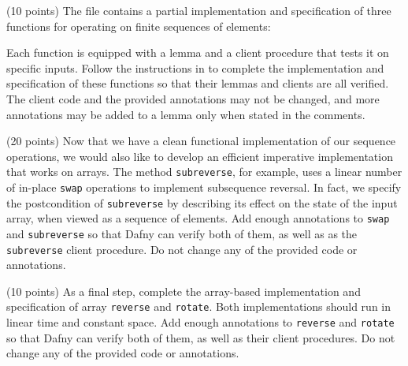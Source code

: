 \documentclass{handout}
\begin{document}
\begin{questions}

\item (10 points) \label{prob:dafny-first} The file  
contains a partial implementation and specification of three functions for
operating on finite sequences of elements:


Each function is equipped with a lemma and a client procedure that tests it on
specific inputs. Follow the instructions in   to complete
the implementation and specification of these functions so that their lemmas and
clients are all verified.  The client code and the provided annotations may not
be changed, and more annotations may be added to a lemma only when stated in the
comments. 



\item (20 points) Now that we have a clean functional implementation of our
sequence operations, we would also like to develop an efficient imperative
implementation that works on arrays.  The method \lstinline{subreverse}, for
example, uses a linear number of in-place \lstinline{swap} operations to
implement subsequence reversal. In fact, we specify the postcondition of
\lstinline{subreverse} by describing its effect on the state of the input array,
when viewed as a sequence of elements. Add enough annotations to
\lstinline{swap} and \lstinline{subreverse} so that Dafny can verify both of
them, as well as as the \lstinline{subreverse} client procedure.  Do not change
any of the provided code or annotations. 



\item (10 points)  \label{prob:dafny-last} As a final step, complete the
array-based implementation and specification of array \lstinline{reverse} and
\lstinline{rotate}. Both implementations should run in linear time and constant
space.  Add enough annotations to \lstinline{reverse} and \lstinline{rotate} so
that Dafny can verify both of them, as well as their client procedures.  Do not
change any of the provided code or annotations. 



\end{questions}
\end{document}
